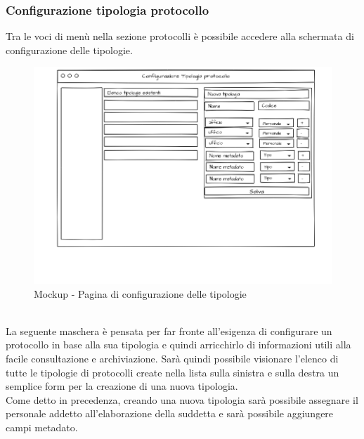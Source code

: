 \subsubsection{Configurazione tipologia protocollo}
Tra le voci di menù nella sezione protocolli è possibile accedere alla schermata di configurazione delle tipologie.
\begin{figure}[!h] 
    \centering 
    \includegraphics[width=1\columnwidth]{immagini/mockup/configtipo.png}
    \caption{Mockup - Pagina di configurazione delle tipologie}
\end{figure}
\\
La seguente maschera è pensata per far fronte all'esigenza di configurare un protocollo in base alla sua tipologia e quindi arricchirlo di informazioni utili alla facile consultazione e archiviazione. Sarà quindi possibile visionare l'elenco di tutte le tipologie di protocolli create nella lista sulla sinistra e sulla destra un semplice form per la creazione di una nuova tipologia.
\\
Come detto in precedenza, creando una nuova tipologia sarà possibile assegnare il personale addetto all'elaborazione della suddetta e sarà possibile aggiungere campi metadato.

